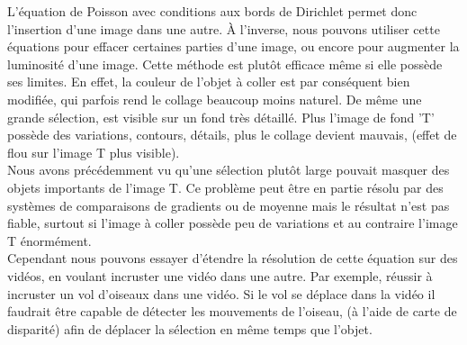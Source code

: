 L'équation de Poisson avec conditions aux bords de Dirichlet permet donc l'insertion d'une image dans une autre. À l'inverse, nous pouvons utiliser cette équations pour effacer certaines parties d'une image, ou encore pour augmenter la luminosité d'une image. Cette méthode est plutôt efficace même si elle possède ses limites. En effet, la couleur de l'objet à coller est par conséquent bien modifiée, qui parfois rend le collage beaucoup moins naturel. De même une grande sélection, est visible sur un fond très détaillé. Plus l'image de fond 'T' possède des variations, contours, détails, plus le collage devient mauvais, (effet de flou sur l'image T plus visible). \\
Nous avons précédemment vu qu'une sélection plutôt large pouvait masquer des objets importants de l'image T. Ce problème peut être en partie résolu par des systèmes de comparaisons de gradients ou de moyenne mais le résultat n'est pas fiable, surtout si l'image à coller possède peu de variations et au contraire l'image T énormément.\\ Cependant nous pouvons essayer d'étendre la résolution de cette équation sur des vidéos, en voulant incruster une vidéo dans une autre. Par exemple, réussir à incruster un vol d'oiseaux dans une vidéo. Si le vol se déplace dans la vidéo il faudrait être capable de détecter les mouvements de l'oiseau, (à l'aide de carte de disparité) afin de déplacer la sélection en même temps que l'objet.